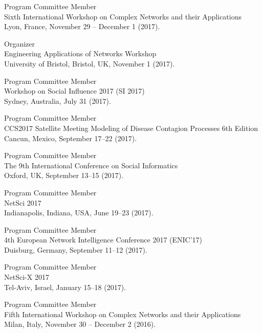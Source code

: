 \documentclass[11pt,letter]{article}
\renewenvironment{itemize}{
  \begin{list}{}{
    \setlength{\leftmargin}{1.5em}
    \setlength{\itemsep}{0.25em}
    \setlength{\parskip}{0pt}
    \setlength{\parsep}{0.25em}
  }
}{
  \end{list}
}
\begin{document}
\begin{itemize}
\item Program Committee Member\\
Sixth International Workshop on Complex Networks and their Applications\\
Lyon, France, November 29 -- December 1 (2017).

\item Organizer\\
Engineering Applications of Networks Workshop\\
University of Bristol, Bristol, UK, November 1 (2017).

\item Program Committee Member\\
Workshop on Social Influence 2017 (SI 2017)\\
Sydney, Australia, July 31 (2017).

\item Program Committee Member\\
CCS2017 Satellite Meeting Modeling of Disease Contagion Processes 6th Edition\\
Cancun, Mexico, September 17--22 (2017).

\item Program Committee Member\\
The 9th International Conference on Social Informatics\\
Oxford, UK, September 13--15 (2017).

\item Program Committee Member\\
NetSci 2017\\
Indianapolis, Indiana, USA, June 19--23 (2017).

\item Program Committee Member\\
4th European Network Intelligence Conference 2017 (ENIC'17)\\
Duisburg, Germany, September 11--12 (2017).

\item Program Committee Member\\
NetSci-X 2017\\
Tel-Aviv, Israel, January 15--18 (2017).

\item Program Committee Member\\
Fifth International Workshop on Complex Networks and their Applications\\
Milan, Italy, November 30 -- December 2 (2016).


\end{itemize}
\end{document}
